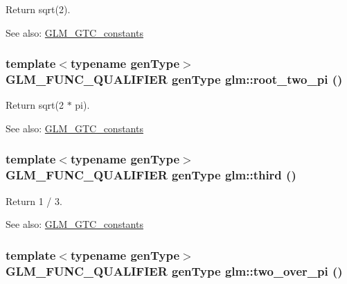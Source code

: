 Return sqrt(2). \begin{Desc}
\item[See also:]\hyperlink{group__gtc__constants}{GLM\_\-GTC\_\-constants} \end{Desc}
\hypertarget{group__gtc__constants_g030fc8d3f9b605ce3d21dba058c930dd}{
\subsubsection[root\_\-two\_\-pi]{\setlength{\rightskip}{0pt plus 5cm}template$<$typename genType$>$ GLM\_\-FUNC\_\-QUALIFIER genType glm::root\_\-two\_\-pi ()}}
\label{group__gtc__constants_g030fc8d3f9b605ce3d21dba058c930dd}


Return sqrt(2 $\ast$ pi). \begin{Desc}
\item[See also:]\hyperlink{group__gtc__constants}{GLM\_\-GTC\_\-constants} \end{Desc}
\hypertarget{group__gtc__constants_ge45f6bc38af321ae365cf702a527c574}{
\subsubsection[third]{\setlength{\rightskip}{0pt plus 5cm}template$<$typename genType$>$ GLM\_\-FUNC\_\-QUALIFIER genType glm::third ()}}
\label{group__gtc__constants_ge45f6bc38af321ae365cf702a527c574}


Return 1 / 3. \begin{Desc}
\item[See also:]\hyperlink{group__gtc__constants}{GLM\_\-GTC\_\-constants} \end{Desc}
\hypertarget{group__gtc__constants_g3b92bf25d756f2d34a531394146decbf}{
\subsubsection[two\_\-over\_\-pi]{\setlength{\rightskip}{0pt plus 5cm}template$<$typename genType$>$ GLM\_\-FUNC\_\-QUALIFIER genType glm::two\_\-over\_\-pi ()}}
\label{group__gtc__constants_g3b92bf25d756f2d34a531394146decbf}


